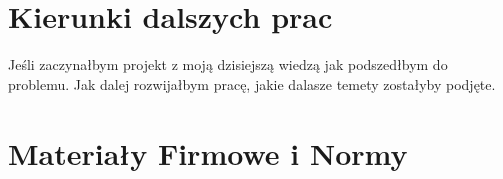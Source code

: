 \documentclass[12pt]{report}
\begin{document}
 \chapter*{Kierunki dalszych prac}
 Jeśli zaczynałbym projekt z moją dzisiejszą wiedzą jak podszedłbym do problemu. Jak dalej rozwijałbym pracę, jakie dalasze temety zostałyby podjęte. 




 
 \nocite{*}
 
 
 
 \chapter*{Materiały Firmowe i Normy}
 

 
\end{document}
